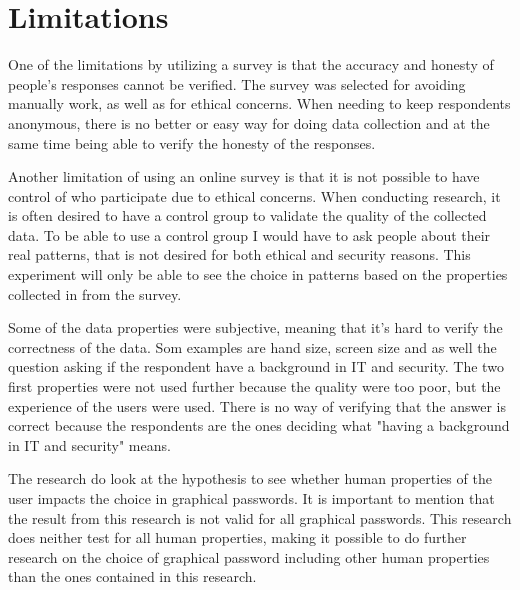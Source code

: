   \section{Limitations}
    One of the limitations by utilizing a survey is that the accuracy and honesty of people's responses cannot be verified. The survey was selected for avoiding manually work, as well as for ethical concerns. When needing to keep respondents anonymous, there is no better or easy way for doing data collection and at the same time being able to verify the honesty of the responses. 

    Another limitation of using an online survey is that it is not possible to have control of who participate due to ethical concerns. When conducting research, it is often desired to have a control group to validate the quality of the collected data. To be able to use a control group I would have to ask people about their real patterns, that is not desired for both ethical and security reasons. This experiment will only be able to see the choice in patterns based on the properties collected in from the survey.

    Some of the data properties were subjective, meaning that it's hard to verify the correctness of the data. Som examples are hand size, screen size and as well the question asking if the respondent have a background in IT and security. The two first properties were not used further because the quality were too poor, but the experience of the users were used. There is no way of verifying that the answer is correct because the respondents are the ones deciding what "having a background in IT and security" means. 

    The research do look at the hypothesis to see whether human properties of the user impacts the choice in graphical passwords. It is important to mention that the result from this research is not valid for all graphical passwords. This research does neither test for all human properties, making it possible to do further research on the choice of graphical password including other human properties than the ones contained in this research. 

